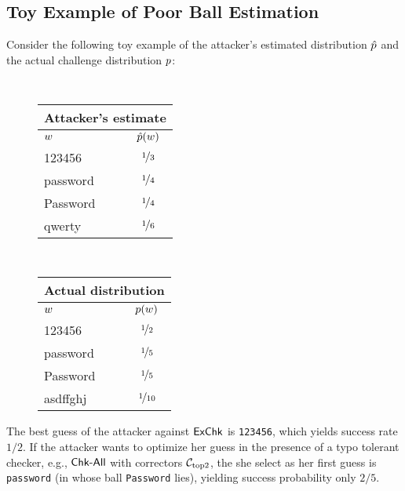 
\subsection{Toy Example of Poor Ball Estimation} 
\label{sec:example}

Consider the following toy 
example of the attacker's estimated distribution $\hat{p}$ and the actual 
challenge distribution $p$:

\begin{figure}[h]
  \centering
  {\tt\small
  \begin{tabular}[t]{lc}
    \multicolumn{2}{c}{\textnormal{Attacker's estimate}}\\
    \hline
    ${w}$ & $\hat{p}({w})$\\\hline
    123456 & $\nicefrac{1}{3}$\\
    password & $\nicefrac{1}{4}$\\
    Password & $\nicefrac{1}{4}$\\
    qwerty & $\nicefrac{1}{6}$\\
    \hline
  \end{tabular}
}
  {\tt\small
  \begin{tabular}[t]{lc}
    \multicolumn{2}{c}{\textnormal{Actual distribution}}\\
    \hline
    ${w}$ & $p({w})$ \\\hline
    123456 & $\nicefrac{1}{2}$\\
    password & $\nicefrac{1}{5}$\\
    Password & $\nicefrac{1}{5}$\\
    asdffghj & $\nicefrac{1}{10}$\\
    \hline
  \end{tabular}
}
\end{figure}
\noindent The best guess of the attacker against $\textnormal{\textsf{ExChk}}$ is
{\tt 123456}, which yields success rate $1/2$. 
If the attacker wants to optimize her guess in the presence of a typo tolerant
checker, e.g., $\textnormal{\textsf{Chk-All}}$ with correctors ${\mathcal C}_{\textrm{top2}}$, the
she select as her first guess is {\tt password} (in whose ball {\tt Password} lies), yielding success probability only $2/5$. 

